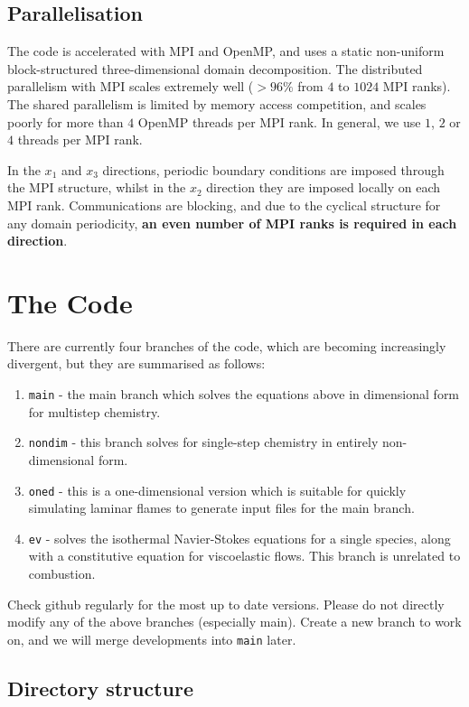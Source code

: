 \documentclass[notitlepage]{revtex4-1}
\begin{document}
\subsection{Parallelisation}

The code is accelerated with MPI and OpenMP, and uses a static non-uniform block-structured three-dimensional domain decomposition. The distributed parallelism with MPI scales extremely well ($>96\%$ from $4$ to $1024$ MPI ranks). The shared parallelism is limited by memory access competition, and scales poorly for more than $4$ OpenMP threads per MPI rank. In general, we use $1$, $2$ or $4$ threads per MPI rank.

In the $x_{1}$ and $x_{3}$ directions, periodic boundary conditions are imposed through the MPI structure, whilst in the $x_{2}$ direction they are imposed locally on each MPI rank. Communications are blocking, and due to the cyclical structure for any domain periodicity, \textbf{an even number of MPI ranks is required in each direction}.


\section{The Code}

There are currently four branches of the code, which are becoming increasingly divergent, but they are summarised as follows:
\begin{enumerate}
\item \verb|main| - the main branch which solves the equations above in dimensional form for multistep chemistry.
\item \verb|nondim| - this branch solves for single-step chemistry in entirely non-dimensional form.
\item \verb|oned| - this is a one-dimensional version which is suitable for quickly simulating laminar flames to generate input files for the main branch.
\item \verb|ev| - solves the isothermal Navier-Stokes equations for a single species, along with a constitutive equation for viscoelastic flows. This branch is unrelated to combustion.
\end{enumerate}

Check github regularly for the most up to date versions. Please do not directly modify any of the above branches (especially main). Create a new branch to work on, and we will merge developments into \verb|main| later.

\subsection{Directory structure}
\end{document}
